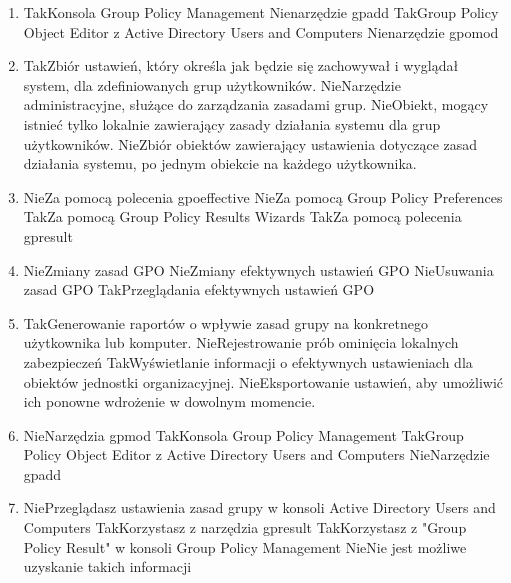 \begin{enumerate}
		\newpage
		
		\item {}%
		{Tak}{Konsola Group Policy Management}%
		{Nie}{narzędzie gpadd}%
		{Tak}{Group Policy Object Editor z Active Directory Users and Computers}%
		{Nie}{narzędzie gpomod}
		
		\item {}%
		{Tak}{Zbiór ustawień, który określa jak będzie się zachowywał i wyglądał system, dla zdefiniowanych grup użytkowników.}%
		{Nie}{Narzędzie administracyjne, służące do zarządzania zasadami grup.}%
		{Nie}{Obiekt, mogący istnieć tylko lokalnie zawierający zasady działania systemu dla grup użytkowników.}%
		{Nie}{Zbiór obiektów zawierający ustawienia dotyczące zasad działania systemu, po jednym obiekcie na każdego użytkownika.}
		
		\item {}%
		{Nie}{Za pomocą polecenia gpoeffective}%
		{Nie}{Za pomocą Group Policy Preferences}%
		{Tak}{Za pomocą Group Policy Results Wizards}%
		{Tak}{Za pomocą polecenia gpresult}
		
		\item {}%
		{Nie}{Zmiany zasad GPO}%
		{Nie}{Zmiany efektywnych ustawień GPO}%
		{Nie}{Usuwania zasad GPO}%
		{Tak}{Przeglądania efektywnych ustawień GPO}
		
		\item {}%
		{Tak}{Generowanie raportów o wpływie zasad grupy na konkretnego użytkownika lub komputer.}%
		{Nie}{Rejestrowanie prób ominięcia lokalnych zabezpieczeń}%
		{Tak}{Wyświetlanie informacji o efektywnych ustawieniach dla obiektów jednostki organizacyjnej.}%
		{Nie}{Eksportowanie ustawień, aby umożliwić ich ponowne wdrożenie w dowolnym momencie.}
		
		\item {}%
		{Nie}{Narzędzia gpmod}%
		{Tak}{Konsola Group Policy Management}%
		{Tak}{Group Policy Object Editor z Active Directory Users and Computers}%
		{Nie}{Narzędzie gpadd}
		
		\item {}%
		{Nie}{Przeglądasz ustawienia zasad grupy w konsoli Active Directory Users and Computers}%
		{Tak}{Korzystasz z narzędzia gpresult}%
		{Tak}{Korzystasz z  "Group Policy Result" w konsoli Group Policy Management}%
		{Nie}{Nie jest możliwe uzyskanie takich informacji}
		

\end{enumerate}
